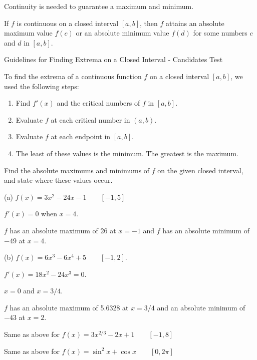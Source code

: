 \documentclass[../bccalc.tex]{subfiles}
\begin{document}
Continuity is needed to guarantee a maximum and minimum.

\begin{theorem}
    If $f$ is continuous on a closed interval $[a,b]$, then $f$ attains an absolute maximum value $f(c)$ or an absolute minimum value $f(d)$ for some numbers $c$ and $d$ in $[a,b]$.
\end{theorem}

Guidelines for Finding Extrema on a Closed Interval - Candidates Test 

To find the extrema of a continuous function $f$ on a closed interval $[a,b]$, we used the following steps:
\begin{enumerate}
    \item Find $f'(x)$ and the critical numbers of $f$ in $[a,b]$.
    \item Evaluate $f$ at each critical number in $(a,b)$.
    \item Evaluate $f$ at each endpoint in $[a,b]$.
    \item The least of these values is the minimum. The greatest is the maximum.
\end{enumerate}

\begin{example}
    Find the absolute maximums and minimums of $f$ on the given closed interval, and state where these values occur.

    (a) $f(x)=3x^2-24x-1 \qquad [-1,5]$

    $f'(x)=0$ when $x=4$.

    $f$ has an absolute maximum of 26 at $x=-1$ and $f$ has an absolute minimum of $-49$ at $x=4$.

    (b) $f(x)=6x^3-6x^4+5 \qquad [-1,2]$.

    $f'(x)=18x^2-24x^3=0$.

    $x=0$ and $x=3/4$.

    $f$ has an absolute maximum of 5.6328 at $x=3/4$ and an absolute minimum of $-43$ at $x=2$.
\end{example}

\ex Same as above for $f(x)=3x^{2/3}-2x+1 \qquad [-1,8]$

\ex Same as above for $f(x)=\sin^2 x+\cos x\qquad [0,2\pi]$
\end{document}
